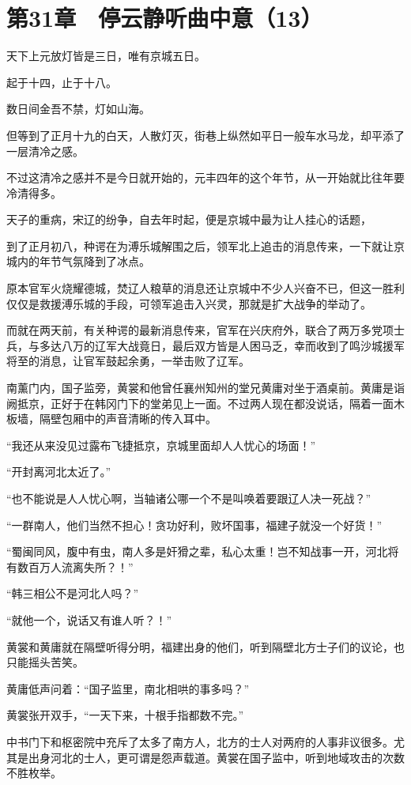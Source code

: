 \section{第31章　停云静听曲中意（13）}

天下上元放灯皆是三日，唯有京城五日。

起于十四，止于十八。

数日间金吾不禁，灯如山海。

但等到了正月十九的白天，人散灯灭，街巷上纵然如平日一般车水马龙，却平添了一层清冷之感。

不过这清冷之感并不是今日就开始的，元丰四年的这个年节，从一开始就比往年要冷清得多。

天子的重病，宋辽的纷争，自去年时起，便是京城中最为让人挂心的话题，

到了正月初八，种谔在为溥乐城解围之后，领军北上追击的消息传来，一下就让京城内的年节气氛降到了冰点。

原本官军火烧耀德城，焚辽人粮草的消息还让京城中不少人兴奋不已，但这一胜利仅仅是救援溥乐城的手段，可领军追击入兴灵，那就是扩大战争的举动了。

而就在两天前，有关种谔的最新消息传来，官军在兴庆府外，联合了两万多党项士兵，与多达八万的辽军大战竟日，最后双方皆是人困马乏，幸而收到了鸣沙城援军将至的消息，让官军鼓起余勇，一举击败了辽军。

南薰门内，国子监旁，黄裳和他曾任襄州知州的堂兄黄庸对坐于酒桌前。黄庸是诣阙抵京，正好于在韩冈门下的堂弟见上一面。不过两人现在都没说话，隔着一面木板墙，隔壁包厢中的声音清晰的传入耳中。

“我还从来没见过露布飞捷抵京，京城里面却人人忧心的场面！”

“开封离河北太近了。”

“也不能说是人人忧心啊，当轴诸公哪一个不是叫唤着要跟辽人决一死战？”

“一群南人，他们当然不担心！贪功好利，败坏国事，福建子就没一个好货！”

“蜀闽同风，腹中有虫，南人多是奸猾之辈，私心太重！岂不知战事一开，河北将有数百万人流离失所？！”

“韩三相公不是河北人吗？”

“就他一个，说话又有谁人听？！”

黄裳和黄庸就在隔壁听得分明，福建出身的他们，听到隔壁北方士子们的议论，也只能摇头苦笑。

黄庸低声问着：“国子监里，南北相哄的事多吗？”

黄裳张开双手，“一天下来，十根手指都数不完。”

中书门下和枢密院中充斥了太多了南方人，北方的士人对两府的人事非议很多。尤其是出身河北的士人，更可谓是怨声载道。黄裳在国子监中，听到地域攻击的次数不胜枚举。

